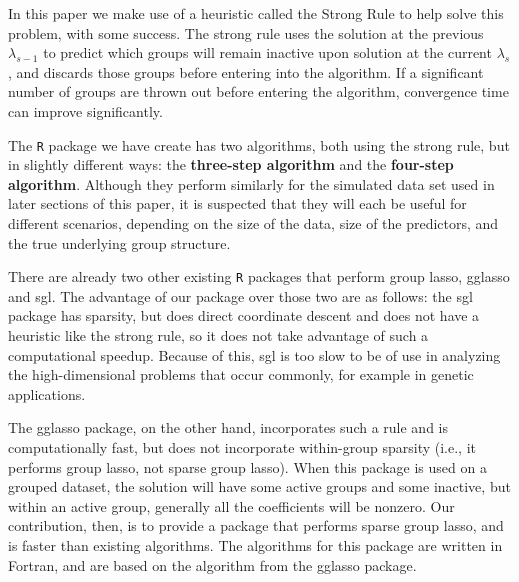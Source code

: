 \documentclass[12pt]{article}
\newcommand{\pkg}[1]{{\normalfont\fontseries{b}\selectfont #1}}
\begin{document}
In this paper we make use of a heuristic called the Strong Rule \citep{tibshirani2012strong} to help solve this problem, with some success. The strong rule uses the solution at the previous $\lambda_{s-1}$ to predict which groups will remain inactive upon solution at the current $\lambda_s$, and discards those groups before entering into the algorithm. If a significant number of groups are thrown out before entering the algorithm, convergence time can improve significantly.

The \texttt{R} package we have create has two algorithms, both using the strong rule, but in slightly different ways: the \textbf{three-step algorithm} and the \textbf{four-step algorithm}. Although they perform similarly for the simulated data set used in later sections of this paper, it is suspected that they will each be useful for different scenarios, depending on the size of the data, size of the predictors, and the true underlying group structure. 


There are already two other existing \texttt{R} packages that perform group lasso, \pkg{gglasso} and \pkg{sgl}. The advantage of our package over those two are as follows: the sgl package has sparsity, but does direct coordinate descent and does not have a heuristic like the strong rule, so it does not take advantage of such a computational speedup. Because of this, \pkg{sgl} is too slow to be of use in analyzing the high-dimensional problems that occur commonly, for example in genetic applications.

The \pkg{gglasso} package, on the other hand, incorporates such a rule and is computationally fast, but does not incorporate within-group sparsity (i.e., it performs group lasso, not sparse group lasso). When this package is used on a grouped dataset, the solution will have some active groups and some inactive, but within an active group, generally all the coefficients will be nonzero. Our contribution, then, is to provide a package that performs sparse group lasso, and is faster than existing algorithms. The algorithms for this package are written in Fortran, and are based on the algorithm from the gglasso package.
\end{document}
